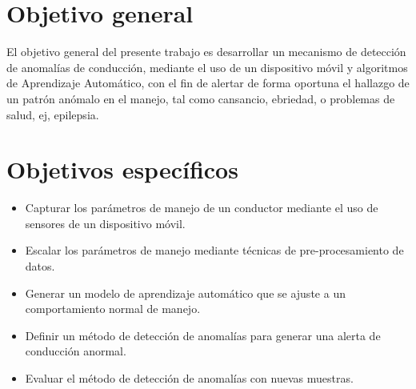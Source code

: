 
\section{Objetivo general}

El objetivo general del presente trabajo es desarrollar un mecanismo de detecci\'{o}n de anomal\'{i}as de conducción, mediante el uso de un dispositivo móvil y algoritmos de Aprendizaje Automático, con el fin de alertar de forma oportuna el hallazgo de un patrón anómalo en el manejo, tal como cansancio, ebriedad, o problemas de salud, ej, epilepsia.

\section{Objetivos específicos}
\begin{itemize}

\item Capturar los parámetros de manejo de un conductor mediante el uso de sensores de un dispositivo móvil.
\item Escalar los parámetros de manejo mediante técnicas de pre-procesamiento de datos.
\item Generar un modelo de aprendizaje automático que se ajuste a un comportamiento normal de manejo.
\item Definir un método de detección de anomalías para generar una alerta de conducción anormal.
\item Evaluar el método de detección de anomalías con nuevas muestras.

\end{itemize}
